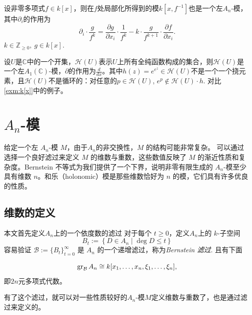 \documentclass[12pt,a4paper]{ctexrep}   %
\begin{document}
\begin{example}
    \label{exm:k[x,f^{-1}]}
    设非零多项式$f\in k[x]$，则在$f$处局部化所得到的模$k[x,f^{-1}]$也是一个左$A_n$-模，其中$\partial_i$的作用为
    \begin{equation*}
        \partial_i\cdot \frac{g}{f^k}=\frac{\partial g}{\partial x_i}\cdot \frac{1}{f^k}-k\cdot \frac{g}{f^{k+1}}\cdot \frac{\partial f}{\partial x_i}.
    \end{equation*}
    $k \in \mathbb{Z}_{\geq 0},\ g \in k[x].$
\end{example}

\begin{example}
    设$U$是$\mathbb{C}$中的一个开集，$\mathcal{H}(U)$表示$U$上所有全纯函数构成的集合，则$\mathcal{H}(U)$是一个左$A_1(\mathbb{C})$-模，$\partial$的作用为$\frac{d}{dx}$。其中$h(z)=e^{e^z}\in \mathcal{H}(U)$不是一个一个挠元素，且$\mathcal{H}(U)$不是循环的：对任意的$p\in \mathcal{H}(U)$, $e^p\notin \mathcal{H}(U)\cdot h$.
    对比 \ref{exm:k[x]}中的例子。
\end{example}



\newpage

\section{$A_n$-模}
给定一个左 $A_n$-模 $M$，由于$A_n$的非交换性，$M$ 的结构可能非常复杂。
可以通过选择一个良好滤过来定义 $M$ 的维数与重数，这些数值反映了 $M$ 的渐近性质和复杂度。Bernstein 不等式为我们提供了一个下界，说明非零有限生成的 $A_n$-模至少具有维数 $n$。和乐（holonomic）模是那些维数恰好为 $n$ 的模，它们具有许多优良的性质。


\subsection{维数的定义}

本文首先定义$A_n$上的一个依度数的滤过
对于每个 $t\ge0$，定义$A_n$上的 $k$-子空间
\begin{equation*}
    B_t:=\left\{D\in A_n\mid \deg D\leq t\right\}
\end{equation*}
容易验证 $\mathcal{B}:=\{B_t\}_{t=0}^\infty$ 是 $A_n$ 的一个递增滤过，称为\emph{Bernstein 滤过}.
且有下面
\begin{proposition}
    \begin{equation*}
        \operatorname{gr}_{\mathcal{B}}A_n\cong k[x_1,\dots,x_n,\xi_1,\dots,\xi_n],
    \end{equation*}
    即$2n$元多项式代数。
\end{proposition}
有了这个滤过，就可以对一些性质较好的$A_n$-模$M$定义维数与重数了，也是通过滤过来定义的。
\end{document}
